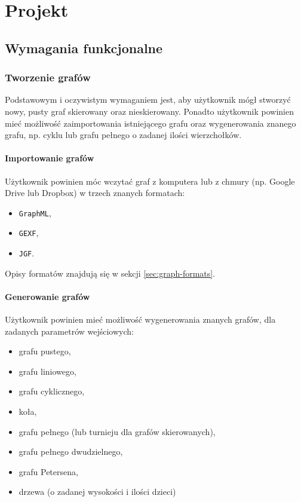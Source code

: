 \chapter{Projekt}

\section{Wymagania funkcjonalne}

\subsection{Tworzenie grafów}
Podstawowym i oczywistym wymaganiem jest, aby użytkownik mógł stworzyć nowy, pusty graf skierowany oraz nieskierowany. Ponadto użytkownik powinien mieć możliwość zaimportowania istniejącego grafu oraz wygenerowania znanego grafu, np. cyklu lub grafu pełnego o zadanej ilości wierzchołków. 

\subsubsection{Importowanie grafów} \label{subsubsec:import}
Użytkownik powinien móc wczytać graf z komputera lub z chmury (np. Google Drive lub Dropbox) w trzech znanych formatach: 

\begin{itemize}
\setlength\itemsep{0em}
\item \texttt{GraphML},
\item \texttt{GEXF},
\item \texttt{JGF}.
\end{itemize}

Opisy formatów znajdują się w sekcji \ref{sec:graph-formats}.

\subsubsection{Generowanie grafów}

Użytkownik powinien mieć możliwość wygenerowania znanych grafów, dla zadanych parametrów wejściowych:

\begin{itemize}
\setlength\itemsep{0em}
\item grafu pustego,
\item grafu liniowego,
\item grafu cyklicznego,
\item koła,
\item grafu pełnego (lub turnieju dla grafów skierowanych),
\item grafu pełnego dwudzielnego,
\item grafu Petersena,
\item drzewa (o zadanej wysokości i ilości dzieci)
\end{itemize}

